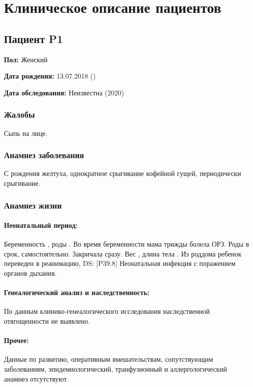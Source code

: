 \documentclass[a4paper,14pt]{extarticle}
\newcommand{\gramm}{г}
\newcommand{\cm}{см}
\newcommand{\DS}[2]{[#2] #1}
\begin{document}
\section{\label{appendix:curricula-vitae}Клиническое описание пациентов}

\setlength{\parindent}{0cm}

\subsection*{Пациент P1}

\textbf{Пол:} Женский

\textbf{Дата рождения:} 13.07.2018 ()

\textbf{Дата обследования:} Неизвестна (2020)

\subsubsection*{Жалобы}

Сыпь на лице.

\subsubsection*{Анамнез заболевания}

С рождения желтуха, однократное срыгивание кофейной гущей, периодически срыгивание.

\subsubsection*{Анамнез жизни}

\paragraph{Неонатальный период:}
Беременность , роды .
Во время беременности мама трижды болела ОРЗ.
Роды в срок, самостоятельно.
Закричала сразу.
Вес \numprint[\gramm]{2940}, длина тела \numprint[\cm]{49}.
Из роддома ребенок переведен в реанимацию, DS: \DS{Неонатальная инфекция с поражением органов дыхания}{P39.8}.

\paragraph{Генеалогический анализ и наследственность:} По данным клинико\hyp{}генеалогического исследования наследственной отягощенности не выявлено.

\paragraph{Прочее:} Данные по развитию, оперативным вмешательствам, сопутствующим заболеваниям, эпидемиологический, транфузионный и аллергологический анамнез отсутствуют.
\end{document}
